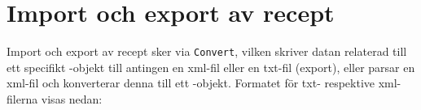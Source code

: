 \section{Import och export av recept}
Import och export av recept sker via \verb=Convert=, vilken skriver datan relaterad till ett specifikt \Recipe-objekt till antingen en xml-fil eller en txt-fil (export), eller parsar en xml-fil och konverterar denna till ett \Recipe-objekt. Formatet för txt- respektive xml-filerna visas nedan:

\begin{framed}

\end{framed}

\begin{framed}

\end{framed}

\begin{framed}

\end{framed}
